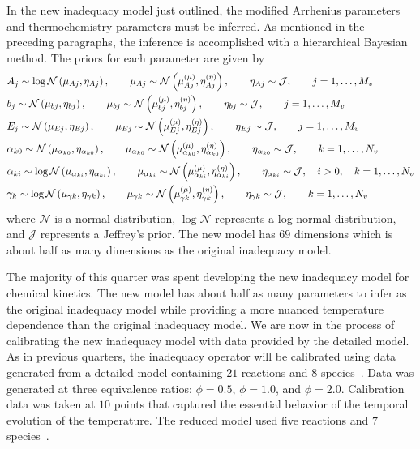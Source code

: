 \documentclass[fontsize=12pt, %
               paper=a4, %
               hyperref]{report}
\begin{document}
  In the new inadequacy model just outlined, the modified Arrhenius 
  parameters and thermochemistry parameters must be inferred.  As mentioned 
  in the preceding paragraphs, the inference is accomplished with a 
  hierarchical Bayesian method.  The priors for each parameter are given by 
  \begin{align}
    &A_{j} \sim \log\mathcal{N}\left(\mu_{Aj}, \eta_{Aj}\right), \qquad 
    \mu_{Aj} \sim \mathcal{N}\left(\mu_{Aj}^{\left(\mu\right)}, \eta_{Aj}^{\left(\eta\right)}\right), \qquad 
    \eta_{Aj} \sim \mathcal{J}, \qquad j = 1,\dots, M_{v} \\
    &b_{j} \sim \mathcal{N}\left(\mu_{bj}, \eta_{bj}\right), \qquad 
    \mu_{bj} \sim \mathcal{N}\left(\mu_{bj}^{\left(\mu\right)}, \eta_{bj}^{\left(\eta\right)}\right), \qquad 
    \eta_{bj} \sim \mathcal{J}, \qquad j = 1,\dots, M_{v} \\
    &E_{j} \sim \mathcal{N}\left(\mu_{Ej}, \eta_{Ej}\right), \qquad 
    \mu_{Ej} \sim \mathcal{N}\left(\mu_{Ej}^{\left(\mu\right)}, \eta_{Ej}^{\left(\eta\right)}\right), \qquad 
    \eta_{Ej} \sim \mathcal{J}, \qquad j = 1,\dots, M_{v} \\
    &\alpha_{k0} \sim \mathcal{N}\left(\mu_{\alpha_{k0}}, \eta_{\alpha_{k0}}\right), \qquad 
    \mu_{\alpha_{k0}} \sim \mathcal{N}\left(\mu_{\alpha_{k0}}^{\left(\mu\right)}, \eta_{\alpha_{k0}}^{\left(\eta\right)}\right), \qquad 
    \eta_{\alpha_{k0}} \sim \mathcal{J}, \qquad k = 1,\dots, N_{v} \\
    &\alpha_{ki} \sim \log\mathcal{N}\left(\mu_{\alpha_{ki}}, \eta_{\alpha_{ki}}\right), \qquad 
    \mu_{\alpha_{ki}} \sim \mathcal{N}\left(\mu_{\alpha_{ki}}^{\left(\mu\right)}, \eta_{\alpha_{ki}}^{\left(\eta\right)}\right), \qquad 
    \eta_{\alpha_{ki}} \sim \mathcal{J}, \quad i > 0, \quad k = 1,\dots, N_{v} \\
    &\gamma_{k} \sim \log\mathcal{N}\left(\mu_{\gamma k}, \eta_{\gamma k}\right), \qquad 
    \mu_{\gamma k} \sim \mathcal{N}\left(\mu_{\gamma k}^{\left(\mu\right)}, \eta_{\gamma k}^{\left(\eta\right)}\right), \qquad 
    \eta_{\gamma k} \sim \mathcal{J}, \qquad k = 1,\dots, N_{v}
  \end{align}
  where $\mathcal{N}$ is a normal distribution, $\log\mathcal{N}$ 
  represents a log-normal distribution, and $\mathcal{J}$ represents 
  a Jeffrey's prior.  The new model has $69$ dimensions which is about 
  half as many dimensions as the original inadequacy model.

  The majority of this quarter was spent developing the new inadequacy 
  model for chemical kinetics.  The new model has about half as many 
  parameters to infer as the original inadequacy model while providing 
   a more nuanced temperature dependence than the original 
  inadequacy model.  We are now in the process of calibrating the new 
  inadequacy model with data provided by the detailed model.  As in 
  previous quarters, the inadequacy operator will be calibrated using 
  data generated from a detailed model containing $21$ reactions and $8$ 
  species~\cite{yoo2009three}.  Data was generated at three equivalence 
  ratios:  $\phi = 0.5$, $\phi = 1.0$, and $\phi = 2.0$.  Calibration data 
  was taken at $10$ points that captured the essential behavior of the temporal 
  evolution of the temperature.  The reduced model used five reactions and 
  $7$ species~\cite{williams2008detailed}.
  
\end{document}
